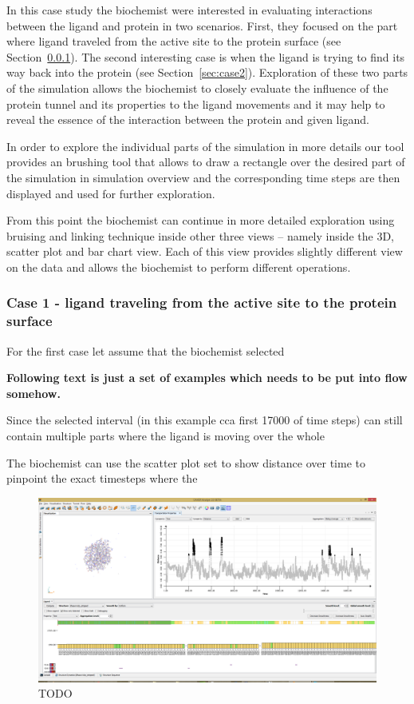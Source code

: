 \documentclass[twocolumn]{bmcart}%
\begin{document}
In this case study the biochemist were interested in evaluating interactions between the ligand and protein in two scenarios. 
First, they focused on the part where ligand traveled from the active site to the protein surface (see Section~\ref{sec:case1}). 
The second interesting case is when the ligand is trying to find its way back into the protein (see Section~\ref{sec:case2}).
Exploration of these two parts of the simulation allows the biochemist to closely evaluate the influence of the protein tunnel and its properties to the ligand movements and it may help to reveal the essence of the interaction between the protein and given ligand.

In order to explore the individual parts of the simulation in more details our tool provides an brushing tool that allows to draw a rectangle over the desired part of the simulation in simulation overview and the corresponding time steps are then displayed and used for further exploration.

From this point the biochemist can continue in more detailed exploration using bruising and linking technique inside other three views -- namely inside the 3D, scatter plot and bar chart view.
Each of this view provides slightly different view on the data and allows the biochemist to perform different operations.

\subsubsection{Case 1 - ligand traveling from the active site to the protein surface}
\label{sec:case1}
For the first case let assume that the biochemist selected 

{\color{red}
\textbf{Following text is just a set of examples which needs to be put into flow somehow.}} 

Since the selected interval (in this example cca first 17000 of time steps) can still contain multiple parts where the ligand is moving over the whole    


The biochemist can use the scatter plot set to show distance over time to pinpoint the exact timesteps  where the 

\begin{figure}[htb]
	\centering
  \includegraphics[width=0.95\linewidth]{img/case_example_1.png}
  \caption{\label{fig:case_overview} {\color{red}TODO}}
\end{figure}
\end{document}
